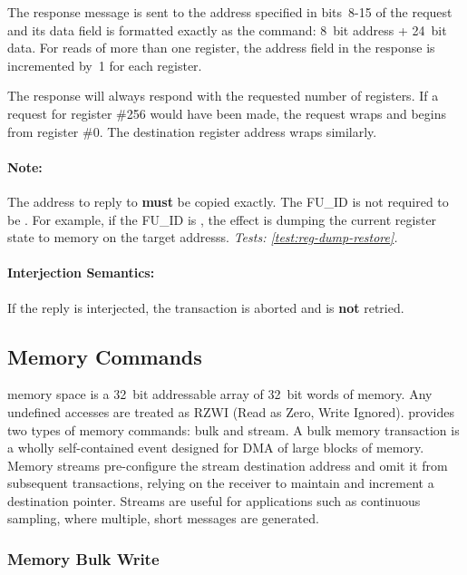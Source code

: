 The response message is sent to the \bus address specified in bits~8-15 of the
request and its data field is formatted exactly as the
 command: 8~bit address + 24~bit data. For reads
of more than one register, the address field in the response is incremented
by~1 for each register.

The response will always respond with the requested number of registers. If a
request for register \#256 would have been made, the request wraps and begins
from register \#0. The destination register address wraps similarly.

\paragraph{Note:} The \bus address to reply to {\bf must} be copied
exactly. The FU\_ID is not required to be . For
example, if the FU\_ID is , the effect is
dumping the current register state to memory on the target addresss.
{\em Tests: \ref{test:reg-dump-restore}.}

\paragraph{Interjection Semantics:} If the reply is interjected, the
transaction is aborted and is {\bf not} retried.

\subsection{Memory Commands}
\label{cmd:mem}
\proto memory space is a 32~bit addressable array of 32~bit words of memory.
Any undefined accesses are treated as RZWI (Read as Zero, Write Ignored).
\proto provides two types of memory commands: bulk and stream. A bulk memory
transaction is a wholly self-contained event designed for DMA of large blocks
of memory. Memory streams pre-configure the stream destination address and
omit it from subsequent transactions, relying on the receiver to maintain and
increment a destination pointer. Streams are useful for applications such as
continuous sampling, where multiple, short messages are generated.

\subsubsection{Memory Bulk Write}
\label{cmd:mem-bulk-write}

